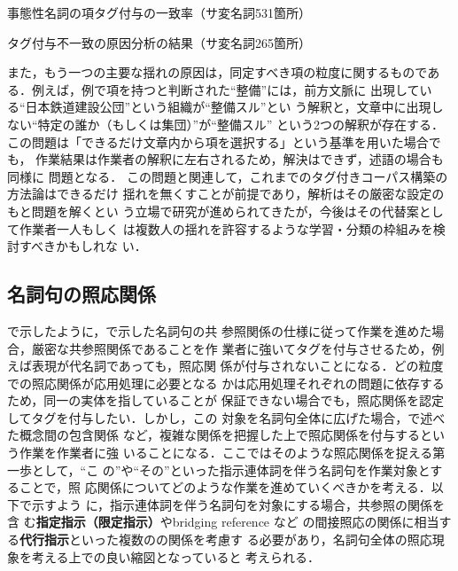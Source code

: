 \documentclass[japanese]{jnlp_1.4}
\def\ssec#1{}
\begin{document}
\begin{table}[b] 
  \caption{事態性名詞の項タグ付与の一致率（サ変名詞531箇所）}
  \label{tab:agree_arg}

\end{table}
\begin{table}[b]
  \caption{タグ付与不一致の原因分析の結果（サ変名詞265箇所）}
  \label{tab:inconsistence}

\end{table}


また，もう一つの主要な揺れの原因は，同定すべき項の粒度に関するものであ
る．例えば，例で項を持つと判断された``整備''には，前方文脈に
出現している``\nobreak 日本鉄道建設公団''という組織が``整備スル''とい
う解釈と，文章中に出現しない``特定の誰か（もしくは集団）''が``整備スル''
という2つの解釈が存在する．
この問題は「できるだけ文章内から項を選択する」という基準を用いた場合でも，
作業結果は作業者の解釈に左右されるため，解決はできず，述語の場合も同様に
問題となる．
この問題と関連して，これまでのタグ付きコーパス構築の方法論はできるだけ
揺れを無くすことが前提であり，解析はその厳密な設定のもと問題を解くとい
う立場で研究が進められてきたが，今後はその代替案として作業者一人もしく
は複数人の揺れを許容するような学習・分類の枠組みを検討すべきかもしれな
い．


\subsection{名詞句の照応関係}
\label{ssec:revise_coref}

\ssec{problem_coref}で示したように，\ssec{spec_coref}で示した名詞句の共
参照関係の仕様に従って作業を進めた場合，厳密な共参照関係であることを作
業者に強いてタグを付与させるため，例えば表現が代名詞であっても，照応関
係が付与されないことになる．どの粒度での照応関係が応用処理に必要となる
かは応用処理それぞれの問題に依存するため，同一の実体を指していることが
保証できない場合でも，照応関係を認定してタグを付与したい．しかし，この
対象を名詞句全体に広げた場合，\ssec{spec_coref}で述べた概念間の包含関係
など，複雑な関係を把握した上で照応関係を付与するという作業を作業者に強
いることになる．ここではそのような照応関係を捉える第一歩として，``こ
の''や``その''といった指示連体詞を伴う名詞句を作業対象とすることで，照
応関係についてどのような作業を進めていくべきかを考える．以下で示すよう
に，指示連体詞を伴う名詞句を対象にする場合，共参照の関係を含
む\textbf{指定指示（限定指示）}やbridging reference \cite{Clark:77}など
の間接照応の関係に相当する\textbf{代行指示}といった複数のの関係を考慮す
る必要があり，名詞句全体の照応現象を考える上での良い縮図となっていると
考えられる．
\end{document}
